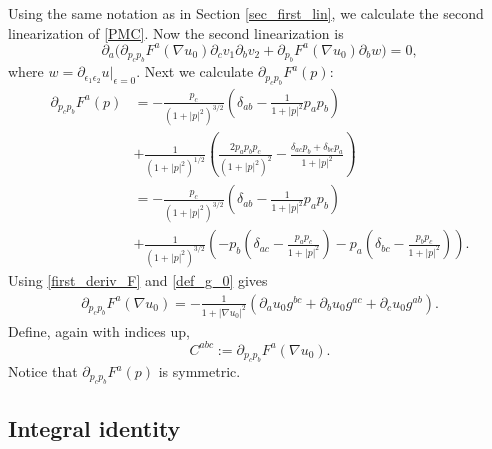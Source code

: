 \documentclass[a4paper, 10pt, twoside, notitlepage]{amsart}
\theoremstyle{plain}
\numberwithin{equation}{section}
\newcommand {\p} {\partial}
\newcommand{\e}{\epsilon}
\newcommand{\abs}[1]{\lvert #1 \rvert}
\begin{document}
Using the same notation as in Section \ref{sec_first_lin}, we calculate the second linearization of \eqref{PMC}. Now the second linearization is
\begin{equation}\label{second_lin_F}
	\p_a\big(\p_{p_cp_b}F^a(\nabla u_0)\p_cv_1\p_bv_2 + \p_{p_b}F^a(\nabla u_0)\p_bw\big)=0,
\end{equation}
where $w=\p_{\e_1\e_2}u|_{\e=0}$. Next we calculate $\p_{p_cp_b}F^a(p)$:
\begin{align*}
	\p_{p_cp_b}F^a(p) &= -\frac{p_c}{(1+\abs{p}^2)^{3/2}}\left(\delta_{ab}-\frac{1}{1+\abs{p}^2}p_ap_b\right) \\
	&+ \frac{1}{(1+\abs{p}^2)^{1/2}}\left(\frac{2p_ap_bp_c}{(1+\abs{p}^2)^2} - \frac{\delta_{ac}p_b + \delta_{bc}p_a}{1+\abs{p}^2}\right)\\
	&= -\frac{p_c}{(1+\abs{p}^2)^{3/2}}\left(\delta_{ab}-\frac{1}{1+\abs{p}^2}p_ap_b\right) \\
	&+ \frac{1}{(1+\abs{p}^2)^{3/2}}\left(-p_b\left(\delta_{ac} - \frac{p_ap_c}{1+\abs{p}^2}\right) - p_a\left(\delta_{bc} - \frac{p_bp_c}{1+\abs{p}^2}\right)\right).
\end{align*}
Using \eqref{first_deriv_F} and \eqref{def_g_0} gives
\begin{align*}
	\p_{p_cp_b}F^a(\nabla u_0)=-\frac{1}{1+\abs{\nabla u_0}^2}(\p_au_0g^{bc} + \p_bu_0 g^{ac} + \p_cu_0 g^{ab}).
\end{align*}
Define, again with indices up,
\begin{equation*}
	C^{abc}:=\p_{p_cp_b}F^a(\nabla u_0).
\end{equation*}
Notice that $\p_{p_cp_b}F^a(p)$ is symmetric.


\subsection{Integral identity}
\end{document}
